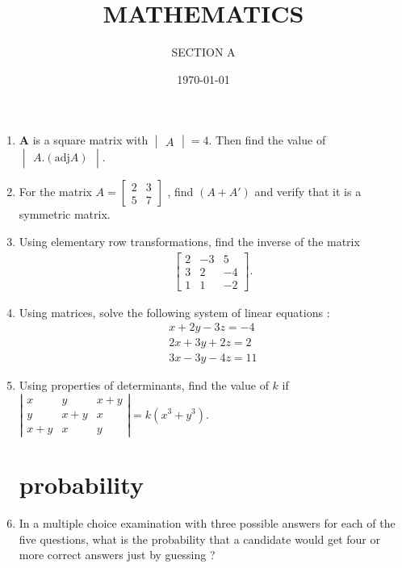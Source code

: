\documentclass[10pt,-letter paper]{article}
\title{MATHEMATICS}
\author{SECTION A}
\date{\today}
\let\vec\mathbf{}
\let\vec\mathbf{}
\let\vec\mathbf{}
\providecommand{\mydet}[1]{\ensuremath{\begin{vmatrix}#1\end{vmatrix}}}
\providecommand{\brak}[1]{\ensuremath{\left(#1\right)}}
\begin{document}
\maketitle

\begin{enumerate}
\section{Matrices}
\item $ \vec{A} $ is a square matrix with $\mydet{A} = 4 $. Then find the value of  $\mydet{ A .\brak{\text{adj} A}}$.

\item For the matrix $A = \left[ \begin{array}{cc}2 & 3  \\ 5 & 7 \end{array} \right]$ , find $\brak{A + A'}$ and verify that it is a symmetric matrix.

\item Using elementary row transformations, find the inverse of the matrix
\begin{align*}
 \left[ \begin{array}{ccc}2 & -3 &5 \\ 3 & 2 & -4 \\ 1 & 1 & -2 \end{array}\right].   
\end{align*}

\item Using matrices, solve the following system of linear equations :
\begin{align*}
 x+2y-3z=-4\\
 2x+3y+2z=2\\
 3x-3y-4z=11
\end{align*}


\item Using properties of determinants, find the value of $k $ if
$\left | \begin{array}{ccc}x & y & x+y \\ y & x+y & x \\ x+y & x & y \end{array}\right|=k\brak{x^{3}+y^{3}}$.


\section{probability}
\item In a multiple choice examination with three possible answers for each of the five questions, what is the probability that a candidate would get four or more correct answers just by guessing ?


\end{enumerate}
\end{document}
